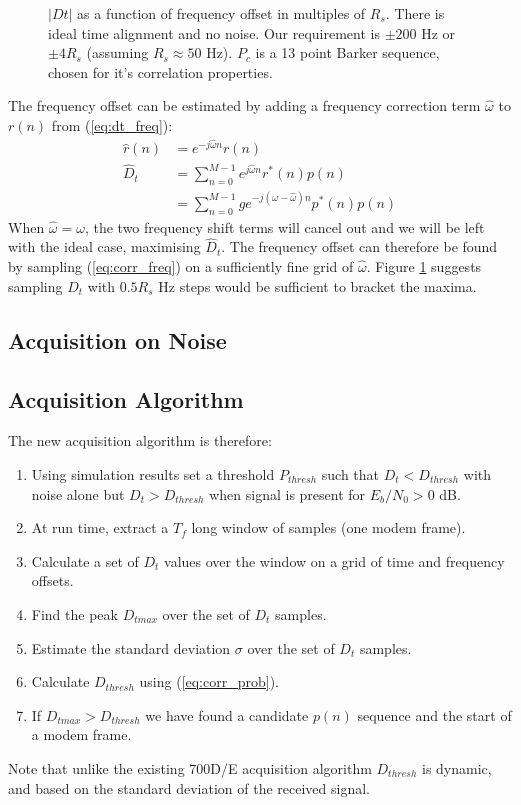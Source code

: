 \documentclass{article}
\begin{document}
\begin{figure}[H]
\caption{$|Dt|$ as a function of frequency offset in multiples of $R_s$.  There is ideal time alignment and no noise. Our requirement is $\pm 200$ Hz or $\pm 4R_s$ (assuming $R_s \approx 50$ Hz). $P_c$ is a 13 point Barker sequence, chosen for it's correlation properties.}
\label{fig:acq_dt_q}
\begin{center}

\end{center}
\end{figure}

The frequency offset can be estimated by adding a frequency correction term $\hat{\omega}$ to $r(n)$ from (\ref{eq:dt_freq}):
\begin{equation}
\begin{split}
\label{eq:corr_freq}
\hat{r}(n) &= e^{-j \hat{\omega} n}r(n) \\
\hat{D}_t &= \sum_{n=0}^{M-1} e^{j \hat{\omega} n} r^*(n) p(n) \\
    &= \sum_{n=0}^{M-1} g e^{-j (\omega - \hat{\omega} ) n} p^*(n)p(n) 
\end{split}
\end{equation}
When $\hat{\omega} = \omega$, the two frequency shift terms will cancel out and we will be left with the ideal  case, maximising $\hat{D}_t$. The frequency offset can therefore be found by sampling (\ref{eq:corr_freq}) on a sufficiently fine grid of $\hat{\omega}$.  Figure \ref{fig:acq_dt_q} suggests sampling $\hat{D}_t$ with $0.5R_s$ Hz steps would be sufficient to bracket the maxima.  

\subsection{Acquisition on Noise}

\subsection{Acquisition Algorithm}

The new acquisition algorithm is therefore:
\begin{enumerate}
\item Using simulation results set a threshold $P_{thresh}$ such that $D_t < D_{thresh}$ with noise alone but $D_t > D_{thresh}$ when signal is present for $E_b/N_0 > 0$ dB.
\item At run time, extract a $T_f$ long window of samples (one modem frame).
\item Calculate a set of $D_t$ values over the window on a grid of time and frequency offsets.
\item Find the peak $D_{tmax}$ over the set of $D_t$ samples.
\item Estimate the standard deviation $\sigma$ over the set of $D_t$ samples.
\item Calculate $D_{thresh}$ using (\ref{eq:corr_prob}).
\item If $D_{tmax} > D_{thresh}$ we have found a candidate $p(n)$ sequence and the start of a modem frame.
\end{enumerate}
Note that unlike the existing 700D/E acquisition algorithm $D_{thresh}$ is dynamic, and based on the standard deviation of the received signal.
\end{document}
